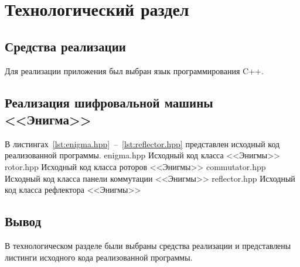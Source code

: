 \chapter{Технологический раздел}

\section{Средства реализации}

Для реализации приложения был выбран язык программирования C++.

\section{Реализация шифровальной машины <<Энигма>>}

В листингах~\ref{lst:enigma.hpp}~--~\ref{lst:reflector.hpp} представлен исходный код реализованной программы.
	{enigma.hpp}
	{Исходный код класса <<Энигмы>>}
	{rotor.hpp}
	{Исходный код класса роторов <<Энигмы>>}
	{commutator.hpp}
	{Исходный код класса панели коммутации <<Энигмы>>}
	{reflector.hpp}
	{Исходный код класса рефлектора <<Энигмы>>}

\section*{Вывод}

В технологическом разделе были выбраны средства реализации и представлены листинги исходного кода реализованной программы.